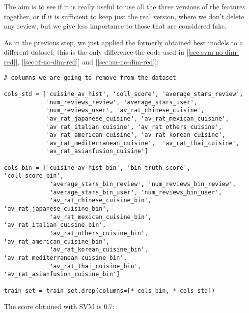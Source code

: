The aim is to see if it is really useful to use all the three versions of the features together, or if it is sufficient to keep just the real version, where we don't delete any review, but we give less importance to those that are considered fake.

As in the previous step, we just applied the formerly obtained best models to a different dataset; this is the only difference \wrt the code used in [\ref{sec:svm-no-dim-red}], [\ref{sec:rf-no-dim-red}] and [\ref{sec:nn-no-dim-red}]:
\begin{lstlisting}[caption={Removing non real features},label={lst:only-real}]
# columns we are going to remove from the dataset

cols_std = ['cuisine_av_hist', 'coll_score', 'average_stars_review',
            'num_reviews_review', 'average_stars_user',
            'num_reviews_user', 'av_rat_chinese_cuisine',
            'av_rat_japanese_cuisine', 'av_rat_mexican_cuisine',
            'av_rat_italian_cuisine', 'av_rat_others_cuisine',
            'av_rat_american_cuisine', 'av_rat_korean_cuisine',
            'av_rat_mediterranean_cuisine',  'av_rat_thai_cuisine',
            'av_rat_asianfusion_cuisine']

cols_bin = ['cuisine_av_hist_bin', 'bin_truth_score', 'coll_score_bin',
             'average_stars_bin_review', 'num_reviews_bin_review',
             'average_stars_bin_user', 'num_reviews_bin_user', 
             'av_rat_chinese_cuisine_bin', 'av_rat_japanese_cuisine_bin',
             'av_rat_mexican_cuisine_bin', 'av_rat_italian_cuisine_bin',
             'av_rat_others_cuisine_bin', 'av_rat_american_cuisine_bin',
             'av_rat_korean_cuisine_bin', 'av_rat_mediterranean_cuisine_bin',
             'av_rat_thai_cuisine_bin', 'av_rat_asianfusion_cuisine_bin']
             
train_set = train_set.drop(columns=[*_cols_bin, *_cols_std])
\end{lstlisting}

The score obtained with SVM is 0.7:

